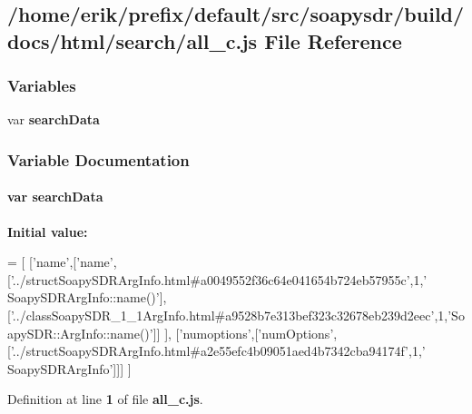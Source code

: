 \subsection{/home/erik/prefix/default/src/soapysdr/build/docs/html/search/all\+\_\+c.js File Reference}
\label{all__c_8js}
\subsubsection*{Variables}
\begin{DoxyCompactItemize}
\item 
var {\bf search\+Data}
\end{DoxyCompactItemize}


\subsubsection{Variable Documentation}
\paragraph[{search\+Data}]{\setlength{\rightskip}{0pt plus 5cm}var search\+Data}\label{all__c_8js_ad01a7523f103d6242ef9b0451861231e}
{\bfseries Initial value\+:}
\begin{DoxyCode}
=
[
  [\textcolor{stringliteral}{'name'},[\textcolor{stringliteral}{'name'},[\textcolor{stringliteral}{'../structSoapySDRArgInfo.html#a0049552f36c64e041654b724eb57955c'},1,\textcolor{stringliteral}{'
      SoapySDRArgInfo::name()'}],[\textcolor{stringliteral}{'../classSoapySDR\_1\_1ArgInfo.html#a9528b7e313bef323c32678eb239d2eec'},1,\textcolor{stringliteral}{'SoapySDR::ArgInfo::name()'}]]
      ],
  [\textcolor{stringliteral}{'numoptions'},[\textcolor{stringliteral}{'numOptions'},[\textcolor{stringliteral}{'../structSoapySDRArgInfo.html#a2e55efc4b09051aed4b7342cba94174f'},1,\textcolor{stringliteral}{'
      SoapySDRArgInfo'}]]]
]
\end{DoxyCode}


Definition at line {\bf 1} of file {\bf all\+\_\+c.\+js}.

